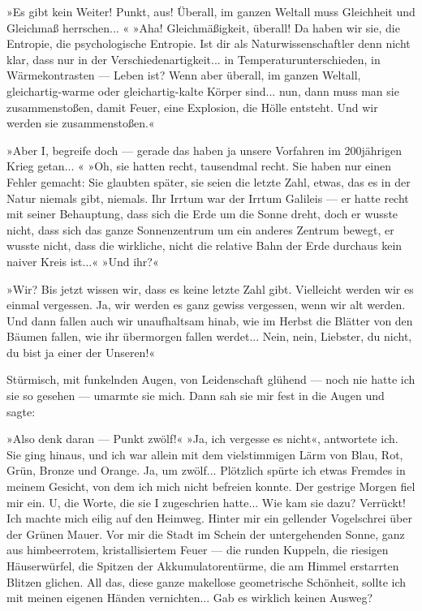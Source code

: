 »Es gibt kein Weiter! Punkt, aus! Überall, im ganzen Weltall muss
Gleichheit und Gleichmaß herrschen... « »Aha! Gleichmäßigkeit,
überall! Da haben wir sie, die Entropie, die psychologische
Entropie. Ist dir als Naturwissenschaftler denn nicht klar, dass
nur in der Verschiedenartigkeit... in Temperaturunterschieden, in
Wärmekontrasten — Leben ist? Wenn aber überall, im ganzen Weltall,
gleichartig-warme oder gleichartig-kalte Körper sind... nun, dann
muss man sie zusammenstoßen, damit Feuer, eine Explosion, die Hölle
entsteht. Und wir werden sie zusammenstoßen.«

»Aber I, begreife doch — gerade das haben ja unsere Vorfahren im
200jährigen Krieg getan... « »Oh, sie hatten recht, tausendmal
recht. Sie haben nur einen Fehler gemacht: Sie glaubten später, sie
seien die letzte Zahl, etwas, das es in der Natur niemals gibt,
niemals. Ihr Irrtum war der Irrtum Galileis — er hatte recht mit
seiner Behauptung, dass sich die Erde um die Sonne dreht, doch er
wusste nicht, dass sich das ganze Sonnenzentrum um ein anderes
Zentrum bewegt, er wusste nicht, dass die wirkliche, nicht die
relative Bahn der Erde durchaus kein naiver Kreis ist...« »Und
ihr?«

»Wir? Bis jetzt wissen wir, dass es keine letzte Zahl gibt.
Vielleicht werden wir es einmal vergessen. Ja, wir werden es ganz
gewiss vergessen, wenn wir alt werden. Und dann fallen auch wir
unaufhaltsam hinab, wie im Herbst die Blätter von den Bäumen
fallen, wie ihr übermorgen fallen werdet... Nein, nein, Liebster,
du nicht, du bist ja einer der Unseren!«

Stürmisch, mit funkelnden Augen, von Leidenschaft glühend — noch
nie hatte ich sie so gesehen — umarmte sie mich. Dann sah sie mir
fest in die Augen und sagte:

»Also denk daran — Punkt zwölf!« »Ja, ich vergesse es nicht«,
antwortete ich. Sie ging hinaus, und ich war allein mit dem
vielstimmigen Lärm von Blau, Rot, Grün, Bronze und Orange. Ja, um
zwölf... Plötzlich spürte ich etwas Fremdes in meinem Gesicht, von
dem ich mich nicht befreien konnte. Der gestrige Morgen fiel mir
ein. U, die Worte, die sie I zugeschrien hatte... Wie kam sie dazu?
Verrückt! Ich machte mich eilig auf den Heimweg. Hinter mir ein
gellender Vogelschrei über der Grünen Mauer. Vor mir die Stadt im
Schein der untergehenden Sonne, ganz aus himbeerrotem,
kristallisiertem Feuer — die runden Kuppeln, die riesigen
Häuserwürfel, die Spitzen der Akkumulatorentürme, die am Himmel
erstarrten Blitzen glichen. All das, diese ganze makellose
geometrische Schönheit, sollte ich mit meinen eigenen Händen
vernichten... Gab es wirklich keinen Ausweg?

